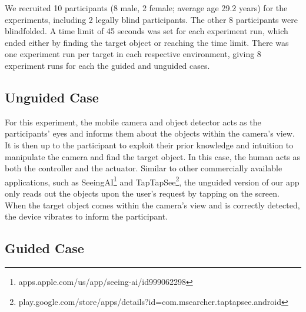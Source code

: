 \documentclass[runningheads]{llncs}
\DeclareRobustCommand{\tofix}[1]{{\sethlcolor{yellow}\hl{[#1]}}}
\begin{document}
We recruited 10 participants (8 male, 2 female; average age 29.2 years) for the experiments, including 2 legally blind participants. 
The other 8 participants were blindfolded. 
A time limit of 45 seconds was set for each experiment run, which ended either by finding the target object or reaching the time limit.
There was one experiment run per target in each respective environment, giving 8 experiment runs for each the guided and unguided cases. %

\subsection{Unguided Case}


For this experiment, the mobile camera and object detector acts as the participants' eyes and informs them about the objects within the camera's view.
It is then up to the participant to exploit their prior knowledge and intuition to manipulate the camera and find the target object. 
In this case, the human acts as both the controller and the actuator. 
Similar to other commercially available applications, such as SeeingAI\footnote{apps.apple.com/us/app/seeing-ai/id999062298} and TapTapSee\footnote{play.google.com/store/apps/details?id=com.msearcher.taptapsee.android}, the unguided version of our app only reads out the objects upon the user's request by tapping on the screen. 
When the target object comes within the camera's view and is correctly detected, the device vibrates to inform the participant. 


\subsection{Guided Case}
\end{document}
